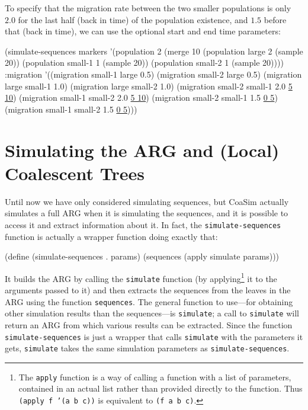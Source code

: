 \documentclass{manual}
\begin{document}
\begin{empfile}
To specify that the migration rate between the two smaller populations
is only $2.0$ for the last half (back in time) of the population
existence, and $1.5$ before that (back in time), we can use the
optional start and end time parameters:
\begin{code}
(simulate-sequences markers
   '(population 2 (merge 10 (population large   2 (sample 20))
                            (population small-1 1 (sample 20))
                            (population small-2 1 (sample 20))))
   :migration '((migration small-1 large   0.5)
                (migration small-2 large   0.5)
                (migration large small-1   1.0)
                (migration large small-2   1.0)
                (migration small-2 small-1 2.0 \underline{5 10})
                (migration small-1 small-2 2.0 \underline{5 10})
                (migration small-2 small-1 1.5 \underline{0 5})
                (migration small-1 small-2 1.5 \underline{0 5})))
\end{code}




\section{Simulating the ARG and (Local) Coalescent Trees}
\label{sec:simul-coal-trees}

Until now we have only considered simulating sequences, but CoaSim
actually simulates a full ARG when it is simulating the sequences, and
it is possible to access it and extract information about it.  In
fact, the \texttt{simulate-sequences} function is actually a wrapper
function doing exactly that:
\begin{code}
(define (simulate-sequences . params)
  (sequences (apply simulate params)))
\end{code}
It builds the ARG by calling the \texttt{simulate} function (by
applying\footnote{The \texttt{apply} function is a way of
  calling a function with a list of parameters, contained in an actual
  list rather than provided directly to the function.  Thus
  \texttt{(apply f '(a b c))} is equivalent to \texttt{(f a b c)}.} it
to the arguments passed to it) and then extracts the sequences from
the leaves in the ARG using the function \texttt{sequences}.  The
general function to use---for obtaining other simulation results than
the sequences---is \texttt{simulate}; a call to \texttt{simulate} will
return an ARG from which various results can be extracted.  Since the
function \texttt{simulate-sequences} is just a wrapper that calls
\texttt{simulate} with the parameters it gets, 
\texttt{simulate} takes the same simulation parameters as
\texttt{simulate-sequences}.


\end{empfile}
\end{document}
